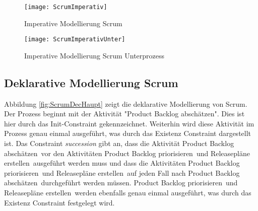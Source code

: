 \begin{sidewaysfigure}[htp]
\begin{center}
  \texttt{[image: ScrumImperativ]} %
  \caption{Imperative Modellierung Scrum}
  \label{fig:ScrumImperativ}
\end{center}
\end{sidewaysfigure}

\begin{figure}[htp]
\begin{center}
  \texttt{[image: ScrumImperativUnter]} %
  \caption{Imperative Modellierung Scrum Unterprozess}
  \label{fig:ScrumImperativUnter}
\end{center}
\end{figure}
\clearpage

\subsection{Deklarative Modellierung Scrum}

Abbildung \ref{fig:ScrumDecHaupt} zeigt die deklarative Modellierung von Scrum. Der Prozess beginnt mit der Aktivität "Product Backlog abschätzen". Dies ist hier durch das Init-Constraint gekennzeichnet. Weiterhin wird diese Aktivität im Prozess genau einmal ausgeführt, was durch das Existenz Constraint dargestellt ist. Das Constraint \textit{succession} gibt an, dass die Aktivität \grqq Product Backlog abschätzen\grqq \ vor den Aktivitäten \grqq Product Backlog priorisieren\grqq \ und \grqq Releasepläne erstellen\grqq \ ausgeführt werden muss und dass die Aktivitäten \grqq Product Backlog priorisieren\grqq \ und \grqq Releasepläne erstellen\grqq \ auf jeden Fall nach \grqq Product Backlog abschätzen\grqq \ durchgeführt werden müssen. \grqq Product Backlog priorisieren\grqq \ und \grqq Releasepläne erstellen\grqq \ werden ebenfalls genau einmal ausgeführt, was durch das Existenz Constraint festgelegt wird.  \newline

